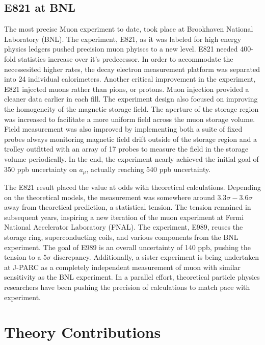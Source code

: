 \subsection{E821 at BNL}
The most precise Muon \gmtwo experiment to date, took place at Brookhaven National Laboratory (BNL). The experiment, E821, as it was labeled for high energy physics ledgers pushed precision muon phyiscs to a new level.  E821 needed 400-fold statistics increase over it's predecessor.  In order to accommodate the necessesited higher rates, the decay electron measurement platform was separated into 24 individual calorimeters.  Another critical improvement in the experiment, E821 injected muons rather than pions, or protons.  Muon injection provided a cleaner data earlier in each fill.  The experiment design also focused on improving the homogeneity of the magnetic storage field.  The aperture of the storage region was increased to facilitate a more uniform field across the muon storage volume.  Field measurement was also improved by implementing both a suite of fixed probes always monitoring magnetic field drift outside of the storage region and a trolley outfitted with an array of 17 probes to measure the field in the storage volume periodically.  In the end, the experiment nearly achieved the initial goal of 350 ppb uncertainty on $a_\mu$, actually reaching 540 ppb uncertainty.

The E821 \gmtwo result placed the value at odds with theoretical calculations.  Depending on the theoretical models, the measurement was somewhere around $3.3\sigma - 3.6\sigma$ away from theoretical prediction, a statistical tension.  The tension remained in subsequent years, inspiring a new iteration of the muon \gmtwo experiment at Fermi National Accelerator Laboratory (FNAL). The experiment, E989, reuses the storage ring, superconducting coils, and various components from the BNL experiment.  The goal of E989 is an overall uncertainty of 140 ppb, pushing the tension to a $5\sigma$ discrepancy. Additionally, a sister experiment is being undertaken at J-PARC as a completely independent measurement of muon \gmtwo with similar sensitivity as the BNL experiment.  In a parallel effort, theoretical particle physics researchers have been pushing the precision of calculations to match pace with experiment.

\section{Theory Contributions}


